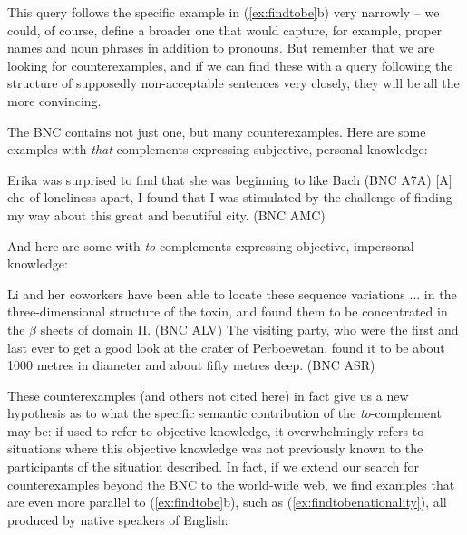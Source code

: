 This query follows the specific example in (\ref{ex:findtobe}b) very narrowly -- we could, of course, define a broader one that would capture,  for example, proper names and noun  phrases in addition to pronouns.  But remember that we are looking for counterexamples,  and if we can find these with a query following the structure of supposedly non\hyp{}acceptable  sentences very closely, they will be all the more convincing.

The BNC  contains not just one, but many counterexamples.  Here are some examples with \textit{that}-complements  expressing subjective, personal knowledge:

\begin{exe}
\ex
\begin{xlist}
\label{ex:findthatsubjective}
\ex Erika was surprised to find that she was beginning to like Bach (BNC A7A)
\ex $[$A$]$che of loneliness apart, I found that I was stimulated by the challenge of finding my way about this great and beautiful city. (BNC AMC)
\end{xlist}
\end{exe}

\noindent And here are some with \textit{to}-complements  expressing objective, impersonal knowledge:

\begin{exe}
\ex
\begin{xlist}
\label{ex:findtobefact}
\ex Li and her coworkers have been able to locate these sequence variations ... in the three\hyp{}dimensional structure of the toxin, and found them to be concentrated in the $\beta$ sheets of domain II. (BNC ALV)
\ex The visiting party, who were the first and last ever to get a good look at the crater of Perboewetan, found it to be about \num{1000} metres in diameter and about fifty metres deep. (BNC ASR)
\end{xlist}
\end{exe}

These counterexamples  (and others not cited here) in fact give us a new hypothesis as to what the specific semantic  contribution of the \textit{to}-complement  may be: if used to refer to objective knowledge, it overwhelmingly refers to situations where this objective knowledge was not previously known to the participants of the situation described. In fact, if we extend our search for counterexamples  beyond the BNC  to the world\hyp{}wide web, we find examples that are even more parallel to (\ref{ex:findtobe}b), such as (\ref{ex:findtobenationality}), all produced by native speakers of English:

